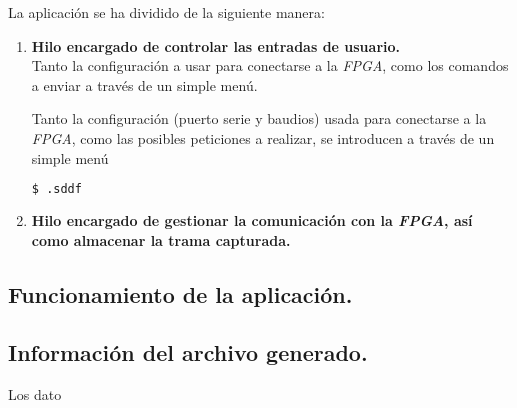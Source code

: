 La aplicación se ha dividido de la siguiente manera:
\begin{enumerate}
    \item \textbf{Hilo encargado de controlar las entradas de usuario.} \\
    Tanto la configuración a usar para conectarse a la \emph{FPGA}, como los comandos a enviar 
    a través de un simple menú.

    Tanto la configuración (puerto serie y baudios) usada para conectarse a la \emph{FPGA}, como las posibles peticiones a realizar, se introducen a través de un simple menú

    \begin{lstlisting}[language=bash,
        caption={Ejemplo de la utilidad de generación de baudios ante \emph{60 MHz} de entrada.},
        label=src:utilidad_baudios_out]
$ .sddf
    \end{lstlisting}


    
    \item \textbf{Hilo encargado de gestionar la comunicación con la \emph{FPGA}, así como almacenar la trama capturada.}
\end{enumerate}


\subsection{Funcionamiento de la aplicación.}

\subsection{Información del archivo generado.}
Los dato












